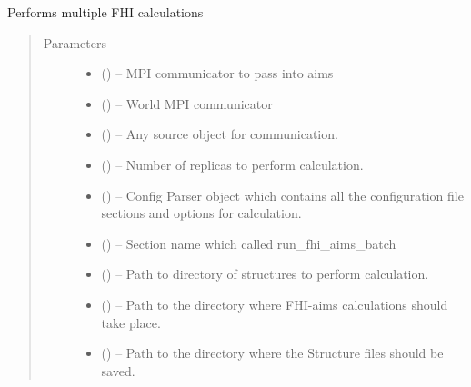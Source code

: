 \documentclass[letterpaper,10pt,english]{sphinxmanual}
\begin{document}
\begin{fulllineitems}
\label{\detokenize{index:Genarris.evaluation.run_fhi_aims.run_fhi_aims_batch}}
Performs multiple FHI calculations
\begin{quote}\begin{description}
\item[{Parameters}] \leavevmode\begin{itemize}
\item {} 
 () -- MPI communicator to pass into aims

\item {} 
 () -- World MPI communicator

\item {} 
 () -- Any source object for communication.

\item {} 
 () -- Number of replicas to perform calculation.

\item {} 
 () -- Config Parser object which contains all the configuration file sections
and options for calculation.

\item {} 
 () -- Section name which called run\_fhi\_aims\_batch

\item {} 
 () -- Path to directory of structures to perform calculation.

\item {} 
 () -- Path to the directory where FHI-aims calculations should take place.

\item {} 
 () -- Path to the directory where the Structure files should be saved.


\end{itemize}
\end{description}
\end{quote}
\end{fulllineitems}
\end{document}
